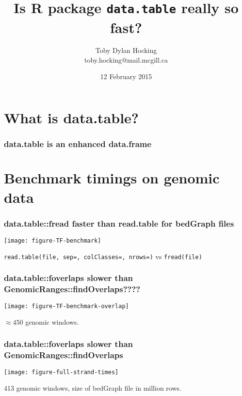 \documentclass{beamer}
\begin{document}
\title{Is R package \texttt{data.table} really so fast?} 

\author{
  Toby Dylan Hocking\\
  toby.hocking@mail.mcgill.ca}

\date{12 February 2015}

\maketitle

\section{What is data.table?}

\begin{frame}
  \frametitle{data.table is an enhanced data.frame}
\end{frame}

\section{Benchmark timings on genomic data}

\begin{frame}
  \frametitle{data.table::fread faster than read.table for bedGraph
    files}
  \texttt{[image: figure-TF-benchmark]}

  \texttt{read.table(file, sep=, colClasses=, nrows=)} vs
  \texttt{fread(file)}
\end{frame}

\begin{frame}
  \frametitle{data.table::foverlaps slower than
    GenomicRanges::findOverlaps????}
  \texttt{[image: figure-TF-benchmark-overlap]}

  $\approx 450$ genomic windows.
\end{frame}

\begin{frame}
  \frametitle{data.table::foverlaps slower than
    GenomicRanges::findOverlaps}
  \texttt{[image: figure-full-strand-times]}

  413 genomic windows, size of bedGraph file in million rows.

\end{frame}
\end{document}
